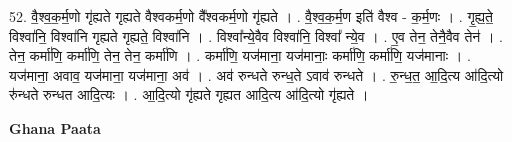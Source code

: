 \documentclass[17pt]{extarticle}
\begin{document}
52. वै॒श्व॒क॒र्म॒णो गृ॑ह्यते गृह्यते वैश्वकर्म॒णो वै᳚श्वकर्म॒णो गृ॑ह्यते । . वै॒श्व॒क॒र्म॒ण इति॑ वैश्व - क॒र्म॒णः । . गृ॒ह्य॒ते॒ विश्वा॑नि॒ विश्वा॑नि गृह्यते गृह्यते॒ विश्वा॑नि । . विश्वा᳚न्ये॒वैव विश्वा॑नि॒ विश्वा᳚ न्ये॒व । . ए॒व तेन॒ तेनै॒वैव तेन॑ । . तेन॒ कर्मा॑णि॒ कर्मा॑णि॒ तेन॒ तेन॒ कर्मा॑णि । . कर्मा॑णि॒ यज॑माना॒ यज॑मानाः॒ कर्मा॑णि॒ कर्मा॑णि॒ यज॑मानाः । . यज॑माना॒ अवाव॒ यज॑माना॒ यज॑माना॒ अव॑ । . अव॑ रुन्धते रुन्ध॒ते ऽवाव॑ रुन्धते । . रु॒न्ध॒त॒ आ॒दि॒त्य आ॑दि॒त्यो रु॑न्धते रुन्धत आदि॒त्यः । . आ॒दि॒त्यो गृ॑ह्यते गृह्यत आदि॒त्य आ॑दि॒त्यो गृ॑ह्यते । \newline

\textbf{Ghana Paata } \newline
\end{document}
